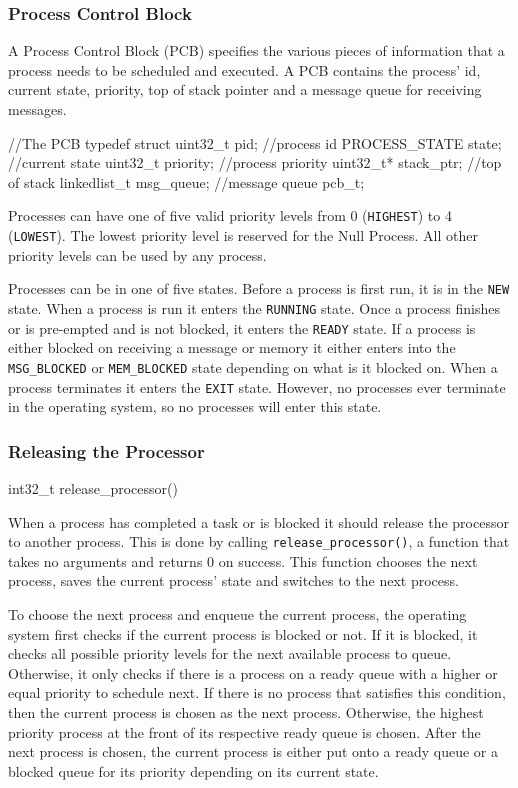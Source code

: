 \documentclass[se]{uw-wkrpt}
\begin{document}
\subsubsection{Process Control Block}

A Process Control Block (PCB) specifies the various pieces of information that a process needs to be scheduled and executed. A PCB contains the process' id, current state, priority, top of stack pointer and a message queue for receiving messages.

\begin{code}
//The PCB
typedef struct {
    uint32_t pid; //process id
    PROCESS_STATE state; //current state
    uint32_t priority; //process priority
    uint32_t* stack_ptr; //top of stack
    linkedlist_t msg_queue; //message queue
} pcb_t;
\end{code}

Processes can have one of five valid priority levels from 0 (\texttt{HIGHEST}) to 4 (\texttt{LOWEST}). The lowest priority level is reserved for the Null Process. All other priority levels can be used by any process.

Processes can be in one of five states. Before a process is first run, it is in the \texttt{NEW} state. When a process is run it enters the \texttt{RUNNING} state. Once a process finishes or is pre-empted and is not blocked, it enters the \texttt{READY} state. If a process is either blocked on receiving a message or memory it either enters into the \texttt{MSG\_BLOCKED} or \texttt{MEM\_BLOCKED} state depending on what is it blocked on. When a process terminates it enters the \texttt{EXIT} state. However, no processes ever terminate in the operating system, so no processes will enter this state.

\subsubsection{Releasing the Processor}

\begin{code}
int32_t release_processor()
\end{code}

When a process has completed a task or is blocked it should release the processor to another process. This is done by calling \texttt{release\_processor()}, a function that takes no arguments and returns 0 on success. This function chooses the next process, saves the current process' state and switches to the next process.

To choose the next process and enqueue the current process, the operating system first checks if the current process is blocked or not. If it is blocked, it checks all possible priority levels for the next available process to queue. Otherwise, it only checks if there is a process on a ready queue with a higher or equal priority to schedule next. If there is no process that satisfies this condition, then the current process is chosen as the next process. Otherwise, the highest priority process at the front of its respective ready queue is chosen. After the next process is chosen, the current process is either put onto a ready queue or a blocked queue for its priority depending on its current state.
\end{document}
